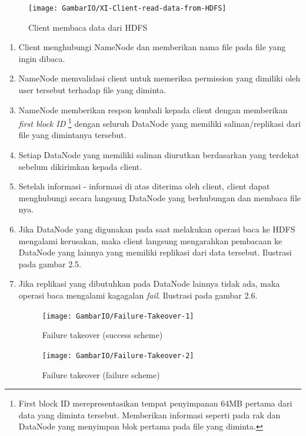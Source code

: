 			\begin{figure}[ht]
			\centering
			\texttt{[image: GambarIO/XI-Client-read-data-from-HDFS]}
			\caption[Client membaca data dari HDFS]{Client membaca data dari HDFS}
			\label{fig:XI-Client-read-data-from-HDFS}
			\end{figure}
			
			
			\begin{enumerate}
				\item Client menghubungi NameNode dan memberikan nama file pada file yang ingin dibaca.
				\item NameNode memvalidasi client untuk memeriksa permission yang dimiliki oleh user tersebut terhadap file yang diminta. 
				\item NameNode memberikan respon kembali kepada client dengan memberikan \textit{first block ID} \footnote{First block ID merepresentasikan tempat penyimpanan 64MB pertama dari data yang diminta tersebut. Memberikan informasi seperti pada rak dan DataNode yang menyimpan blok pertama pada file yang diminta.} dengan seluruh DataNode yang memiliki salinan/replikasi dari file yang dimintanya tersebut.
				\item Setiap DataNode yang memiliki salinan diurutkan berdasarkan yang terdekat sebelum dikirimkan kepada client.
				\item Setelah informasi - informasi di atas diterima oleh client, client dapat menghubungi secara langsung DataNode yang berhubungan dan membaca file nya.
				\item Jika DataNode yang digunakan pada saat melakukan operasi baca ke HDFS mengalami kerusakan, maka client langsung mengarahkan pembacaan ke DataNode yang lainnya yang memiliki replikasi dari data tersebut. Ilustrasi pada gambar 2.5.
				\item Jika replikasi yang dibutuhkan pada DataNode lainnya tidak ada, maka operasi baca mengalami kagagalan \textit{fail}. Ilustrasi pada gambar 2.6.
				
			\begin{figure}[h]
				\centering
				\texttt{[image: GambarIO/Failure-Takeover-1]}
				\caption[Failure takeover 1]{Failure takeover (success scheme)}
				\label{fig:Failure takeover (success scheme)}
			\end{figure}
			
			\begin{figure}[h]
				\centering
				\texttt{[image: GambarIO/Failure-Takeover-2]}
				\caption[Failure takeover 1]{Failure takeover (failure scheme)}
				\label{fig:Failure takeover (failure scheme)}
			\end{figure}
				
			\end{enumerate}		
